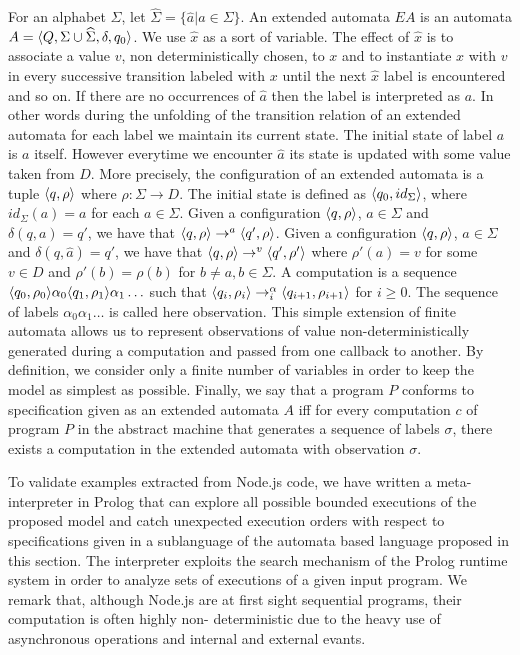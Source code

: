 For an alphabet $\Sigma$, let $\widehat{\Sigma}=\{\widehat{a}|a\in\Sigma\}$.
An extended automata $EA$ is an automata $A=\langle Q,\Sigma\cup\widehat{\Sigma},\delta,q_0 \rangle$.
We use $\widehat{x}$ as a sort of variable.
The effect of $\widehat{x}$ is to associate a value $v$, non deterministically chosen,  
to $x$ and to instantiate $x$ with $v$ in every successive transition labeled with $x$  until the next $\widehat{x}$ label is encountered and so on.
If there are no occurrences of $\widehat{a}$ then the label is interpreted as $a$.
In other words during the unfolding of the transition relation of an extended automata 
for each label we maintain its current state. The initial state of label $a$ is $a$ itself.
However everytime we encounter $\widehat{a}$ its state is updated with some value taken from $D$.
More precisely, the configuration of an extended automata is a tuple
$\langle q,\rho \rangle$ where $\rho:\Sigma\rightarrow D$.
The initial state is defined as $\langle q_0,id_\Sigma \rangle$,  where $id_\Sigma(a)=a$ for each $a\in\Sigma$.
Given a configuration $\langle q,\rho \rangle$, $a\in\Sigma$ and $\delta(q,a)=q'$, 
we have that $\langle q,\rho \rangle\rightarrow^a\langle q',\rho \rangle$.
Given a configuration $\langle q,\rho \rangle$, $a\in\Sigma$ and $\delta(q,\widehat{a})=q'$, 
we have that $\langle q,\rho \rangle\rightarrow^v\langle q',\rho' \rangle$ where $\rho'(a)=v$ for some $v\in D$
and $\rho'(b)=\rho(b)$ for $b\neq a,b\in\Sigma$.
A computation is a sequence $\langle q_0,\rho_0 \rangle\alpha_0\langle q_1,\rho_1 \rangle\alpha_1\ldots$
such that $\langle q_i,\rho_i \rangle\rightarrow^\alpha_i\langle q_{i+1},\rho_{i+1} \rangle$ for $i\geq 0$.
The sequence of labels $\alpha_0\alpha_1\ldots$ is called here observation.
This simple extension of finite automata allows us to represent observations of value non-deterministically generated during a computation and passed from one callback to another. By definition, we consider only a finite number of variables in order to keep the model  as simplest as possible. 
Finally, we say that a program $P$ conforms to specification given as an extended automata $A$ iff for every computation $c$ of program $P$ in the abstract machine that generates a sequence of labels $\sigma$, there exists a computation in the extended automata with observation $\sigma$.

To validate examples extracted from Node.js code, we have written a meta-interpreter in Prolog that can explore all possible bounded executions  of the proposed model and catch unexpected execution orders with respect to specifications given in a sublanguage of the automata based language proposed in this section. The interpreter \cite{prolog} exploits the search mechanism of the Prolog runtime system in order to analyze sets of executions of a given input program. We remark that, although Node.js are at first sight sequential programs, their computation is often highly non- deterministic due to the heavy use of asynchronous operations and internal and external evants. 













